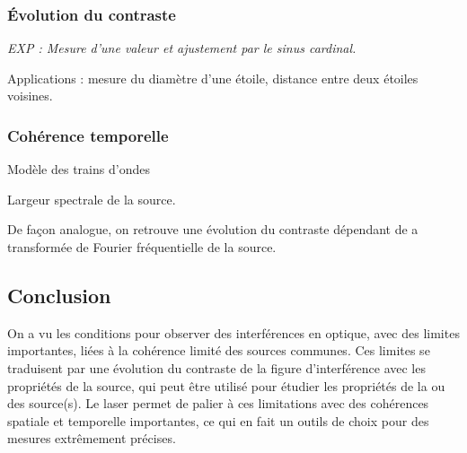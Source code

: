 \subsubsection{Évolution du contraste}

\emph{EXP : Mesure d'une valeur et ajustement par le sinus cardinal.}

Applications : mesure du diamètre d'une étoile, distance entre deux étoiles voisines.

\subsubsection{Cohérence temporelle}

Modèle des trains d'ondes

Largeur spectrale de la source.

De façon analogue, on retrouve une évolution du contraste dépendant de a transformée de Fourier fréquentielle de la source.

\subsection{Conclusion}

On a vu les conditions pour observer des interférences en optique, avec des limites importantes, liées à la cohérence limité des sources communes.
Ces limites se traduisent par une évolution du contraste de la figure d'interférence avec les propriétés de la source, qui peut être utilisé pour étudier les propriétés de la ou des source(s).
Le laser permet de palier à ces limitations avec des cohérences spatiale et temporelle importantes, ce qui en fait un outils de choix pour des mesures extrêmement précises.